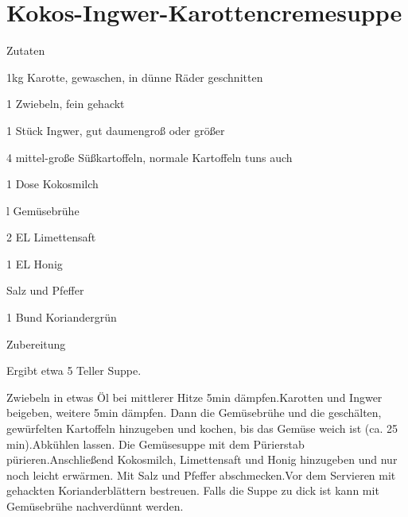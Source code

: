 \chapter*{Kokos-Ingwer-Karottencremesuppe}
\begin{multicols}{2}
 {\Large Zutaten}
 \begin{Zutaten}
		\item 1kg Karotte, gewaschen, in dünne Räder
		geschnitten
		\item 1 Zwiebeln, fein gehackt
		\item 1 Stück Ingwer, gut daumengroß oder größer
		\item 4 mittel-große Süßkartoffeln,
		normale Kartoffeln tuns auch
		\item 1 Dose Kokosmilch
		\item {}l Gemüsebrühe
		\item 2 EL Limettensaft
		\item 1 EL Honig
		\item Salz und Pfeffer
		\item 1 Bund Koriandergrün
		
		
		
				
		
\end{Zutaten}
\columnbreak
{}
\end{multicols}

{\Large Zubereitung} \newline
\begin{addmargin}[1cm]{0cm}
	Ergibt etwa 5 Teller Suppe.\newline\newline
	
	Zwiebeln in etwas Öl bei mittlerer Hitze 5min dämpfen.\newline Karotten und Ingwer beigeben, weitere
	5min dämpfen. Dann die Gemüsebrühe und die geschälten, gewürfelten Kartoffeln hinzugeben und
	kochen, bis das Gemüse weich ist \left(ca. 25 min\right).\newline Abkühlen lassen. Die Gemüsesuppe mit dem Pürierstab pürieren.\newline Anschließend Kokosmilch, Limettensaft und Honig hinzugeben und nur noch leicht erwärmen.\newline
	Mit Salz und Pfeffer abschmecken.\newline Vor dem Servieren mit gehackten Korianderblättern bestreuen.\newline
	Falls die Suppe zu dick ist kann mit Gemüsebrühe nachverdünnt werden.
	
	
	
	
	
\end{addmargin}
